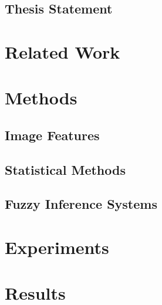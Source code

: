 \documentclass[12pt]{report}
\begin{document}
\section{Thesis Statement}

\chapter{Related Work}



\chapter{Methods}

\section{Image Features}

\section{Statistical Methods}

\section{Fuzzy Inference Systems}

\chapter{Experiments}
\chapter{Results}
\end{document}
